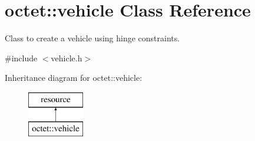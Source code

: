 \hypertarget{classoctet_1_1vehicle}{\section{octet\+:\+:vehicle Class Reference}
\label{classoctet_1_1vehicle}
}


Class to create a vehicle using hinge constraints.  




{\ttfamily \#include $<$vehicle.\+h$>$}

Inheritance diagram for octet\+:\+:vehicle\+:\begin{figure}[H]
\begin{center}
\leavevmode
\includegraphics[height=2.000000cm]{classoctet_1_1vehicle}
\end{center}
\end{figure}
